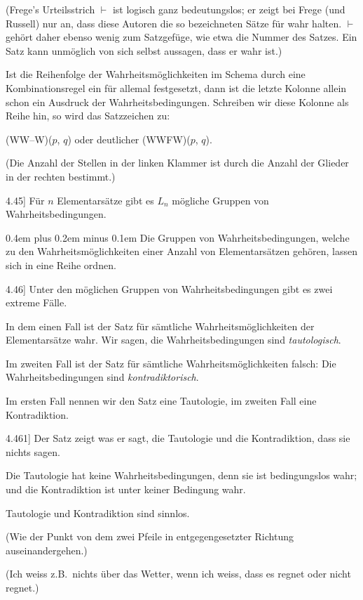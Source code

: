 \documentclass[12pt,oneside]{book}[2007/10/19]
\newcommand{\PropERef}[1]{\hyperref[PropE:#1]{#1}}
\newcommand{\PropositionG}[2]{%
  \item[\phantomsection\label{PropG:#1}\PropERef{#1}] #2%
}
\newcommand{\DPtypo}[2]{#2}
\newcommand{\Emph}[1]{\emph{#1}}%
\newcommand{\zumBeispiel}{z.\;B.}
\newcommand{\stretchyspace}{\spaceskip0.4em plus 0.2em minus 0.1em}
\begin{document}
\begin{propositions}
{(Frege's \glqq{}\DPtypo{Urteilstrich}{Urteilsstrich}\grqq{} \glqq{}$\vdash$\grqq{} ist logisch ganz
bedeutungslos; er zeigt bei Frege (und Russell)
nur an, dass diese Autoren die so bezeichneten
Sätze für wahr halten. \glqq{}$\vdash$\grqq{} gehört daher ebenso
wenig zum Satzgefüge, wie etwa die Nummer des
Satzes. Ein Satz kann unmöglich von sich selbst
aussagen, dass er wahr ist.)

Ist die Reihenfolge der Wahrheitsmöglichkeiten
im Schema durch eine Kombinationsregel ein für
allemal festgesetzt, dann ist die letzte Kolonne
allein schon ein Ausdruck der Wahrheitsbedingungen.
Schreiben wir diese Kolonne als Reihe
hin, so wird das Satzzeichen zu:

\glqq{}(WW--W)($p$, $q$)\grqq{} oder deutlicher \glqq{}(WWFW)($p$, $q$)\grqq{}.

(Die Anzahl der Stellen in der linken Klammer
ist durch die Anzahl der Glieder in der rechten
bestimmt.)}


\PropositionG{4.45}
{Für $n$ Elementarsätze gibt es $L_{n}$ mögliche Gruppen
von Wahrheitsbedingungen.

{\stretchyspace
Die Gruppen von Wahrheitsbedingungen,
welche zu den Wahrheitsmöglichkeiten einer
Anzahl von Elementarsätzen gehören, lassen sich
in eine Reihe ordnen.}}


\PropositionG{4.46}
{Unter den möglichen Gruppen von Wahrheitsbedingungen
gibt es zwei extreme Fälle.

In dem einen Fall ist der Satz für sämtliche
Wahrheitsmöglichkeiten der Elementarsätze wahr.
Wir sagen, die Wahrheitsbedingungen sind
\Emph{tautologisch}.

Im zweiten Fall ist der Satz für sämtliche
Wahrheitsmöglichkeiten falsch: Die Wahrheitsbedingungen
sind \Emph{kontradiktorisch}.

Im ersten Fall nennen wir den Satz eine
Tautologie, im zweiten Fall eine Kontradiktion.}


\PropositionG{4.461}
{Der Satz zeigt was er sagt, die Tautologie und
die Kontradiktion, dass sie nichts sagen.

Die Tautologie hat keine Wahrheitsbedingungen,
denn sie ist bedingungslos wahr; und
die Kontradiktion ist unter keiner Bedingung
wahr.

Tautologie und Kontradiktion sind sinnlos.

(Wie der Punkt von dem zwei Pfeile in
entgegengesetzter Richtung auseinandergehen.)

(Ich weiss \zumBeispiel\ nichts über das Wetter, wenn
ich weiss, dass es regnet oder nicht regnet.)}



\end{propositions}
\end{document}
